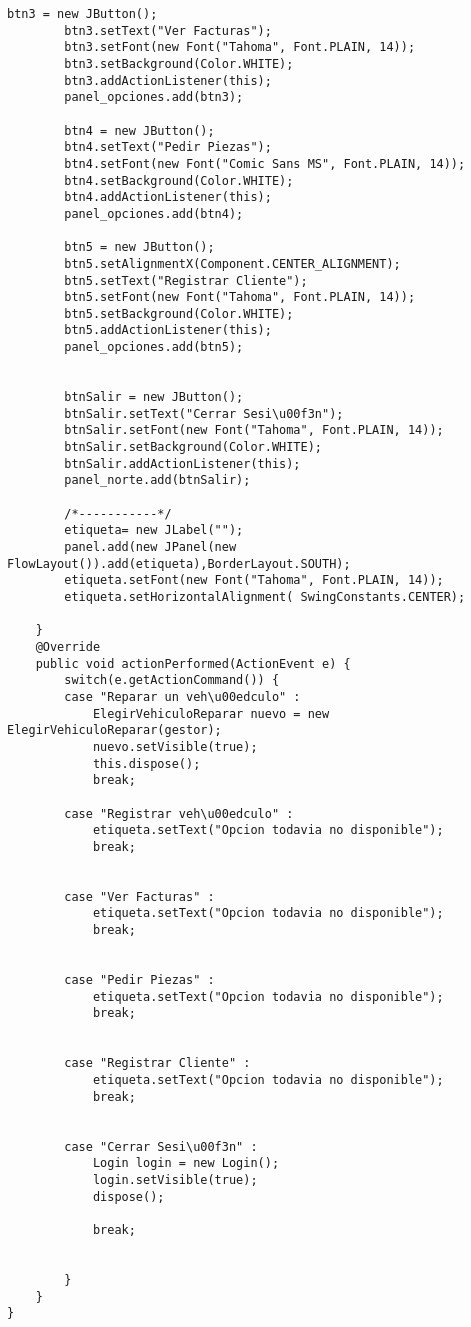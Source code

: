 \begin{lstlisting}[caption=Inicio.java (App Escritorio)]
		btn3 = new JButton();
		btn3.setText("Ver Facturas");
		btn3.setFont(new Font("Tahoma", Font.PLAIN, 14));
		btn3.setBackground(Color.WHITE);
		btn3.addActionListener(this);
		panel_opciones.add(btn3);
		
		btn4 = new JButton();
		btn4.setText("Pedir Piezas");
		btn4.setFont(new Font("Comic Sans MS", Font.PLAIN, 14));
		btn4.setBackground(Color.WHITE);
		btn4.addActionListener(this);
		panel_opciones.add(btn4);
		
		btn5 = new JButton();
		btn5.setAlignmentX(Component.CENTER_ALIGNMENT);
		btn5.setText("Registrar Cliente");
		btn5.setFont(new Font("Tahoma", Font.PLAIN, 14));
		btn5.setBackground(Color.WHITE);
		btn5.addActionListener(this);
		panel_opciones.add(btn5);
		
		
		btnSalir = new JButton();
		btnSalir.setText("Cerrar Sesi\u00f3n");
		btnSalir.setFont(new Font("Tahoma", Font.PLAIN, 14));
		btnSalir.setBackground(Color.WHITE);
		btnSalir.addActionListener(this);
		panel_norte.add(btnSalir);
		
		/*-----------*/
		etiqueta= new JLabel("");
		panel.add(new JPanel(new FlowLayout()).add(etiqueta),BorderLayout.SOUTH);
		etiqueta.setFont(new Font("Tahoma", Font.PLAIN, 14));
		etiqueta.setHorizontalAlignment( SwingConstants.CENTER);
	
	}
	@Override
	public void actionPerformed(ActionEvent e) {
		switch(e.getActionCommand()) {
		case "Reparar un veh\u00edculo" :
			ElegirVehiculoReparar nuevo = new ElegirVehiculoReparar(gestor);
			nuevo.setVisible(true);
			this.dispose();
			break;
			
		case "Registrar veh\u00edculo" :
			etiqueta.setText("Opcion todavia no disponible");
			break;
		
			
		case "Ver Facturas" :
			etiqueta.setText("Opcion todavia no disponible");
			break;
		
			
		case "Pedir Piezas" :
			etiqueta.setText("Opcion todavia no disponible");
			break;
		
			
		case "Registrar Cliente" :
			etiqueta.setText("Opcion todavia no disponible");
			break;
		
			
		case "Cerrar Sesi\u00f3n" :
			Login login = new Login();
			login.setVisible(true);
			dispose();
			
			break;
		
		
		}
	}
}
\end{lstlisting}
\clearpage

